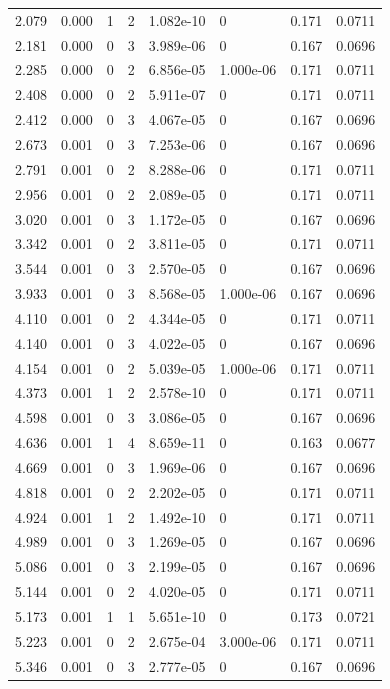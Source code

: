 \documentclass[preview]{standalone}
\begin{document}
{{\begin{tabular}{L{1.2cm}C{1.2cm} C{0.3cm}C{0.5cm} C{1.4cm}C{1.4cm} C{1.4cm}C{1.4cm}}
  2.079  &  0.000  & 1     &  2 &  1.082e-10  & 0  & 0.171 &  0.0711   \\ 
  2.181  &  0.000  & 0     &  3 &  3.989e-06  & 0  & 0.167 &  0.0696   \\ 
  2.285  &  0.000  & 0     &  2 &  6.856e-05  & 1.000e-06  & 0.171 &  0.0711   \\ 
  2.408  &  0.000  & 0     &  2 &  5.911e-07  & 0  & 0.171 &  0.0711   \\ 
  2.412  &  0.000  & 0     &  3 &  4.067e-05  & 0  & 0.167 &  0.0696   \\ 
  2.673  &  0.001  & 0     &  3 &  7.253e-06  & 0  & 0.167 &  0.0696   \\ 
  2.791  &  0.001  & 0     &  2 &  8.288e-06  & 0  & 0.171 &  0.0711   \\ 
  2.956  &  0.001  & 0     &  2 &  2.089e-05  & 0  & 0.171 &  0.0711   \\ 
  3.020  &  0.001  & 0     &  3 &  1.172e-05  & 0  & 0.167 &  0.0696   \\ 
  3.342  &  0.001  & 0     &  2 &  3.811e-05  & 0  & 0.171 &  0.0711   \\ 
  3.544  &  0.001  & 0     &  3 &  2.570e-05  & 0  & 0.167 &  0.0696   \\ 
  3.933  &  0.001  & 0     &  3 &  8.568e-05  & 1.000e-06  & 0.167 &  0.0696   \\ 
  4.110  &  0.001  & 0     &  2 &  4.344e-05  & 0  & 0.171 &  0.0711   \\ 
  4.140  &  0.001  & 0     &  3 &  4.022e-05  & 0  & 0.167 &  0.0696   \\ 
  4.154  &  0.001  & 0     &  2 &  5.039e-05  & 1.000e-06  & 0.171 &  0.0711   \\ 
  4.373  &  0.001  & 1     &  2 &  2.578e-10  & 0  & 0.171 &  0.0711   \\ 
  4.598  &  0.001  & 0     &  3 &  3.086e-05  & 0  & 0.167 &  0.0696   \\ 
  4.636  &  0.001  & 1     &  4 &  8.659e-11  & 0  & 0.163 &  0.0677   \\ 
  4.669  &  0.001  & 0     &  3 &  1.969e-06  & 0  & 0.167 &  0.0696   \\ 
  4.818  &  0.001  & 0     &  2 &  2.202e-05  & 0  & 0.171 &  0.0711   \\ 
  4.924  &  0.001  & 1     &  2 &  1.492e-10  & 0  & 0.171 &  0.0711   \\ 
  4.989  &  0.001  & 0     &  3 &  1.269e-05  & 0  & 0.167 &  0.0696   \\ 
  5.086  &  0.001  & 0     &  3 &  2.199e-05  & 0  & 0.167 &  0.0696   \\ 
  5.144  &  0.001  & 0     &  2 &  4.020e-05  & 0  & 0.171 &  0.0711   \\ 
  5.173  &  0.001  & 1     &  1 &  5.651e-10  & 0  & 0.173 &  0.0721   \\ 
  5.223  &  0.001  & 0     &  2 &  2.675e-04  & 3.000e-06  & 0.171 &  0.0711   \\ 
  5.346  &  0.001  & 0     &  3 &  2.777e-05  & 0  & 0.167 &  0.0696   \\ 
\hline 
\end{tabular} 

}}
\end{document}
